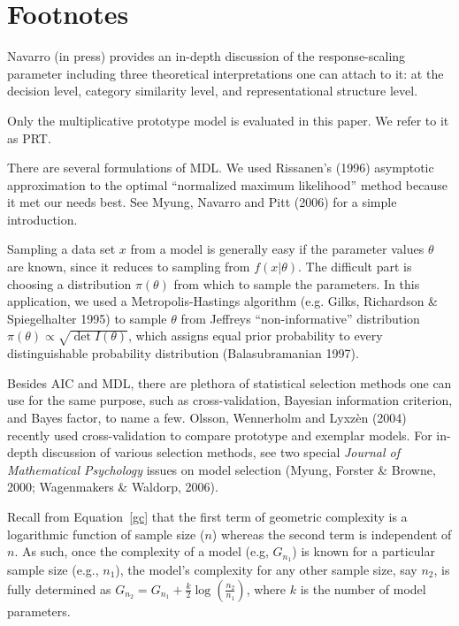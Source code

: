 \documentclass[11pt]{article}
\begin{document}
\newpage
\section*{Footnotes}

\footnotemark[1] Navarro (in press) provides an in-depth discussion of the response-scaling
parameter including three theoretical interpretations one can attach to it: at the
decision level, category similarity level, and representational structure level.

\footnotemark[2] Only the multiplicative prototype model is evaluated in this paper. We refer to
it as PRT.

\footnotemark[3] There are several formulations of MDL. We used Rissanen's (1996)
asymptotic approximation to the optimal ``normalized maximum likelihood'' method because it
met our needs best. See Myung, Navarro and Pitt (2006) for a simple introduction.

\footnotemark[4] Sampling a data set $x$ from a model is generally easy if the parameter values
$\theta$ are known, since it reduces to sampling from $f(x|\theta)$. The difficult part is
choosing a distribution $\pi(\theta)$ from which to sample the parameters. In this application, we
used a Metropolis-Hastings algorithm (e.g. Gilks, Richardson \& Spiegelhalter 1995) to sample
$\theta$ from Jeffreys ``non-informative'' distribution $\pi(\theta) \propto \sqrt{\det
I(\theta)}$, which assigns equal prior probability to every distinguishable probability
distribution (Balasubramanian 1997).

\footnotemark[5] Besides AIC and MDL, there are plethora of statistical selection methods one can
use for the same purpose, such as cross-validation, Bayesian information criterion, and Bayes
factor, to name a few. Olsson, Wennerholm and Lyxz\`{e}n (2004) recently used
cross-validation to compare prototype and exemplar models. For in-depth discussion of various
selection methods, see two special {\it Journal
of Mathematical Psychology} issues on model selection (Myung, Forster \& Browne, 2000; Wagenmakers
\& Waldorp, 2006).

\footnotemark[6] Recall from Equation~\ref{gc} that the first term of geometric complexity is a
logarithmic function of sample size ($n$) whereas the second term is independent of $n$. As such,
once the complexity of a model (e.g, $G_{n_1}$) is known for a particular sample size (e.g.,
$n_1$), the model's complexity for any other sample size, say $n_2$, is fully determined as
$G_{n_2} = G_{n_1} + \frac{k}{2} \log \left(\frac{n_2}{n_1} \right)$, where $k$ is the number of
model parameters.
\end{document}
